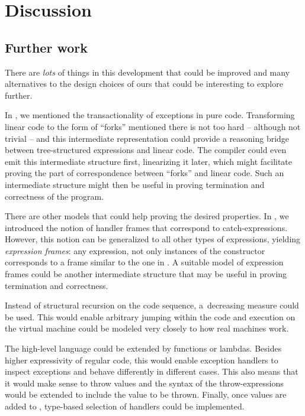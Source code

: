 \chapter{Discussion}

\section{Further work}

There are \emph{lots} of things in this development that could be improved and many alternatives
to the design choices of ours that could be interesting to explore further.

In , we mentioned the transactionality of exceptions in pure code. Transforming
linear code to the form of ``forks'' mentioned there is not too hard -- although not trivial
-- and this
intermediate representation could provide a reasoning bridge between tree-structured expressions
and linear code. The compiler could even emit this intermediate structure first,
linearizing it later, which might facilitate proving the part of correspondence between ``forks''
and linear code. Such an intermediate structure might then be useful in proving termination and
correctness of the program.

There are other models that could help proving the desired properties. In
, we introduced the notion of handler frames that correspond to
catch-expressions. However, this notion can be generalized to all other types of expressions,
yielding \emph{expression frames}: any expression, not only instances of the constructor
 corresponds to a frame similar to the one in .
A suitable model of expression frames could be another intermediate structure that may
be useful in proving termination and correctness.

Instead of structural recursion on the code sequence, a~decreasing measure
could be used. This would enable arbitrary jumping within the code and execution on
the virtual machine could be modeled very closely to how real machines work.

The high-level language could be extended by functions or lambdas. Besides higher expressivity
of regular code, this would enable exception handlers to inspect exceptions and behave differently
in different cases. This also means that it would make sense to throw values and the syntax
of the throw-expressions would be extended to include the value to be thrown.
Finally, once values are added to , type-based selection of handlers could be
implemented.

